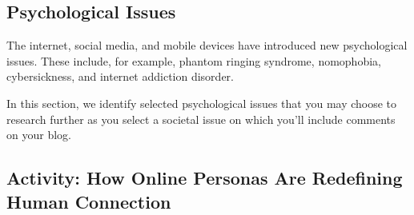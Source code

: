 \documentclass[
  letterpaper,
  DIV=11,
  numbers=noendperiod]{scrreprt}
\begin{document}
\subsection*{Psychological Issues}\label{psychological-issues}

The internet, social media, and mobile devices have introduced new
psychological issues. These include, for example, phantom ringing
syndrome, nomophobia, cybersickness, and internet addiction disorder.

In this section, we identify selected psychological issues that you may
choose to research further as you select a societal issue on which
you'll include comments on your blog.

\subsection{Activity: How Online Personas Are Redefining Human
Connection}\label{activity-how-online-personas-are-redefining-human-connection}
\end{document}
